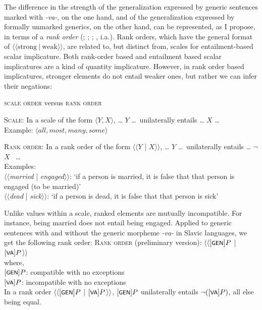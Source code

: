 \documentclass[output=paper,colorlinks,citecolor=brown]{langscibook}
\begin{document}
The difference in the strength of the generalization expressed by generic sentences marked with \textit{-va-}, on the one hand, and of the generalization expressed
by formally unmarked generics, on the other hand, can be represented, as I propose,
in terms of
a \textit{rank order} (\citealt{Lehrer1974}; \citealt{hirschberg1985}; \citealt{Geurts_2010}; \citealt{horn1989,horn2000,horn2010,horn2017}, i.a.).
Rank orders, which have the general format of
$\langle \langle \text{strong} \ | \  \text{weak} \rangle \rangle$,
are related to, but distinct from, scales for entailment-based scalar implicature. Both rank-order based and entailment based scalar implicatures are a kind of quantity implicature. However, in
rank order based implicatures, stronger elements do not entail weaker ones, but rather we can infer their negations:

\eanoraggedright
\textsc{scale order} versus \textsc{rank order} \citep{horn2017}


\smallskip
\textsc{Scale}: In a scale of the form $\langle Y, X \rangle$,
\ldots {} $Y$ \ldots \, unilaterally entails \ldots {} $X$ \ldots\\
Example: $\langle all, most, many, some \rangle$\\
\smallskip

\vspace{-0.3cm}
\textsc{Rank order}: In a rank order of the form
$\langle\langle Y$ | $X \rangle\rangle$, \ldots {} $Y$ \ldots \, unilaterally entails  \ldots {} $\neg$ $X$ \, \ldots\\
Examples:\\
$\langle\langle$\textit{married} | \textit{engaged}$\rangle\rangle$:
`if a person is married, it is false that that person is engaged (to be married)'\\
$\langle \langle$\textit{dead} | \textit{sick}$\rangle \rangle$: `if a person is dead,  it is false that that person is sick'
\z

\noindent
Unlike values within a scale, ranked elements are mutually incompatible. For instance, being married
does not entail being engaged.
Applied to generic sentences with and without the generic morpheme
\textit{-va-} in Slavic languages,
we get the following rank order:
\ea \label{rank.order}
\textsc{Rank order} (preliminary version):
$\langle\langle[\cnst{Gen}]P$ | $[\cnst{va}]P\,\rangle\rangle$\\
where, \\
$[\cnst{Gen}]P$: compatible with no exceptions\\
$[\cnst{va}]P$: incompatible with no exceptions \\
\smallskip
In a rank order $\langle \langle[\cnst{Gen}]P$  |  $[\cnst{va}]P\,\rangle \rangle$, $[\cnst{Gen}]P$ unilaterally entails $\neg([\cnst{va}]P)$, all else being equal.
\z
\end{document}
